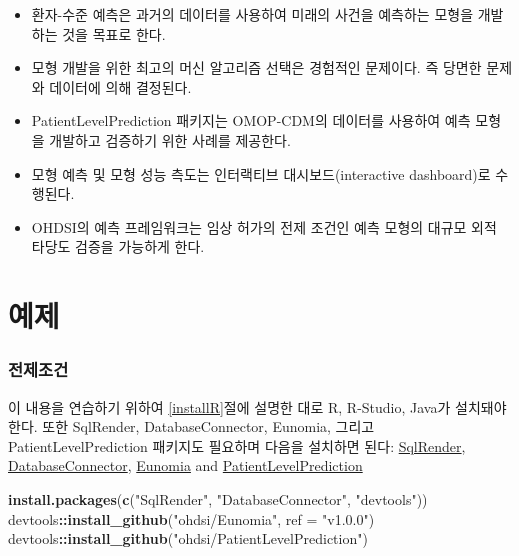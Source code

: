 \documentclass[11pt]{book}
\newenvironment{Shaded}{\begin{snugshade}}{\end{snugshade}}
\newcommand{\KeywordTok}[1]{\textcolor[rgb]{0.13,0.29,0.53}{\textbf{#1}}}
\newcommand{\DataTypeTok}[1]{\textcolor[rgb]{0.13,0.29,0.53}{#1}}
\newcommand{\StringTok}[1]{\textcolor[rgb]{0.31,0.60,0.02}{#1}}
\newcommand{\OperatorTok}[1]{\textcolor[rgb]{0.81,0.36,0.00}{\textbf{#1}}}
\newcommand{\NormalTok}[1]{#1}
\theoremstyle{definition}
\theoremstyle{definition}
\theoremstyle{definition}
\theoremstyle{remark}
\let\BeginKnitrBlock\begin \let\EndKnitrBlock\end
\begin{document}
\BeginKnitrBlock{rmdsummary}
\begin{itemize}
\item
  환자-수준 예측은 과거의 데이터를 사용하여 미래의 사건을 예측하는
  모형을 개발하는 것을 목표로 한다.
\item
  모형 개발을 위한 최고의 머신 알고리즘 선택은 경험적인 문제이다. 즉
  당면한 문제와 데이터에 의해 결정된다.
\item
  PatientLevelPrediction 패키지는 OMOP-CDM의 데이터를 사용하여 예측
  모형을 개발하고 검증하기 위한 사례를 제공한다.
\item
  모형 예측 및 모형 성능 측도는 인터랙티브 대시보드(interactive
  dashboard)로 수행된다.
\item
  OHDSI의 예측 프레임워크는 임상 허가의 전제 조건인 예측 모형의 대규모
  외적 타당도 검증을 가능하게 한다.
\end{itemize}
\EndKnitrBlock{rmdsummary}

\section{예제}\label{-8}

\subsubsection*{전제조건}\label{-6}

이 내용을 연습하기 위하여 \ref{installR}절에 설명한 대로 R, R-Studio,
Java가 설치돼야 한다. 또한 SqlRender, DatabaseConnector, Eunomia, 그리고
PatientLevelPrediction 패키지도 필요하며 다음을 설치하면 된다:
\href{https://ohdsi.github.io/SqlRender/}{SqlRender},
\href{https://ohdsi.github.io/DatabaseConnector/}{DatabaseConnector},
\href{https://ohdsi.github.io/Eunomia/}{Eunomia} and
\href{https://ohdsi.github.io/PatientLevelPrediction/}{PatientLevelPrediction}

\begin{Shaded}
\begin{Highlighting}[]
\KeywordTok{install.packages}\NormalTok{(}\KeywordTok{c}\NormalTok{(}\StringTok{"SqlRender"}\NormalTok{, }\StringTok{"DatabaseConnector"}\NormalTok{, }\StringTok{"devtools"}\NormalTok{))}
\NormalTok{devtools}\OperatorTok{::}\KeywordTok{install_github}\NormalTok{(}\StringTok{"ohdsi/Eunomia"}\NormalTok{, }\DataTypeTok{ref =} \StringTok{"v1.0.0"}\NormalTok{)}
\NormalTok{devtools}\OperatorTok{::}\KeywordTok{install_github}\NormalTok{(}\StringTok{"ohdsi/PatientLevelPrediction"}\NormalTok{)}
\end{Highlighting}
\end{Shaded}
\end{document}
